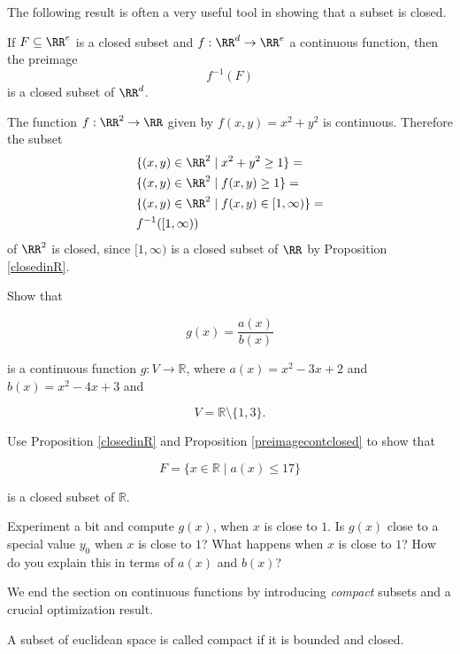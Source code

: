 \documentclass{article}
\begin{document}
The following result is often a very useful tool in showing that a
subset is closed.

\begin{proposition}[emph]\label{preimagecontclosed}
  If $F\subseteq \RR^e$ is a closed subset and $f: \RR^d\rightarrow \RR^e$
  a continuous function, then the preimage
  $$
  f^{-1}(F)
  $$
  is a closed subset of $\RR^d$.
\end{proposition}

\begin{example}
  The function $f:\RR^2\rightarrow \RR$ given by $f(x, y) = x^2 + y^2$ is
  continuous. Therefore the subset
  \begin{align*}
    &\{(x, y)\in \RR^2\mid x^2 + y^2 \geq 1\} = \\
    &\{(x, y)\in \RR^2\mid f(x, y) \geq 1\} = \\
    &\{(x, y)\in \RR^2\mid f(x, y) \in [1, \infty)\} = \\
    &f^{-1}([1, \infty))
  \end{align*}
  of $\RR^2$ is closed, since $[1, \infty)$ is a closed subset
  of $\RR$ by Proposition \ref{closedinR}.
  \end{example}


\beginshex
Show that

$$
g(x) = \dfrac{a(x)}{b(x)}
$$

is a continuous function $g: V\rightarrow \mathbb{R}$, where $a(x) = x^2 - 3 x + 2$ and $b(x) = x^2 - 4 x + 3$ and

$$
V = \mathbb{R}\setminus\{1, 3\}.
$$

Use Proposition \ref{closedinR} and Proposition \ref{preimagecontclosed} to show that

$$
F = \{x\in \mathbb{R} \mid a(x) \leq 17\}
$$

is a closed subset of $\mathbb{R}$.



Experiment a bit and compute $g(x)$, when $x$ is close to $1$. Is $g(x)$ close to a special value $y_0$ when $x$ is close to $1$? What happens when $x$ is close to $1$? How do you explain this in terms of $a(x)$ and $b(x)$?
\endshex


  
  We end the section on continuous functions by introducing \emph{compact} subsets
  and a crucial optimization result.

\begin{definition}[emph]
A subset of euclidean space is called compact if it is bounded and closed.
\end{definition}
\end{document}
